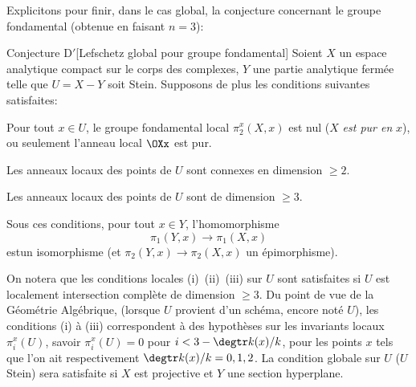 Explicitons pour finir, dans le \og cas global\fg {}, la conjecture concernant le groupe fondamental (obtenue en faisant $n=3$):


\label{XIII.6.D'}
\begin{enonce*}{Conjecture D$\boldsymbol'$}[Lefschetz global pour groupe fondamental\ndemark]
Soient $X$ un espace analytique compact sur le corps des complexes, $Y$ une partie analytique ferm\'ee telle que $U=X-Y$ soit Stein. Supposons de plus les conditions suivantes satisfaites:
\begin{enumeratei}
\item
Pour tout $x\in U$, le groupe fondamental local $\pi_2^x(X, x)$ est nul (\ie $X$ \emph{est \og pur en }$x${\fg}), ou seulement l'anneau local $\OXx$ est pur.
\item
Les anneaux locaux des points de $U$ sont \og connexes en dimension $\geq 2$\fg.
\item
Les anneaux locaux des points de $U$ sont de dimension $\geq 3$.
\end{enumeratei}

Sous ces conditions, pour tout $x\in Y$, l'homomorphisme
$$
\pi_1(Y, x)\to\pi_1(X, x)
$$
est\pageoriginale un isomorphisme (et $\pi_2(Y, x)\to\pi_2(X, x)$ un \'epimorphisme).
\end{enonce*}

On notera que les conditions locales (i)~(ii)~(iii) sur $U$ sont satisfaites si $U$ est localement intersection compl\`ete de dimension $\geq 3$. Du point de vue de la G\'eom\'etrie Alg\'ebrique, (lorsque $U$ provient d'un sch\'ema, encore not\'e $U$), les conditions (i) \`a (iii) correspondent \`a des hypoth\`eses sur les invariants locaux $\pi_i^x(U)$, \ignorespaces savoir \hbox{$\pi_i^x(U)=0$} pour $i<3-\degtr k(x)/k$, pour les points $x$ tels que l'on ait respectivement $\degtr k(x)/k=0, 1, 2$. La condition globale sur $U$ ($U$ Stein) sera satisfaite si $X$ est projective et $Y$ une section hyperplane.

